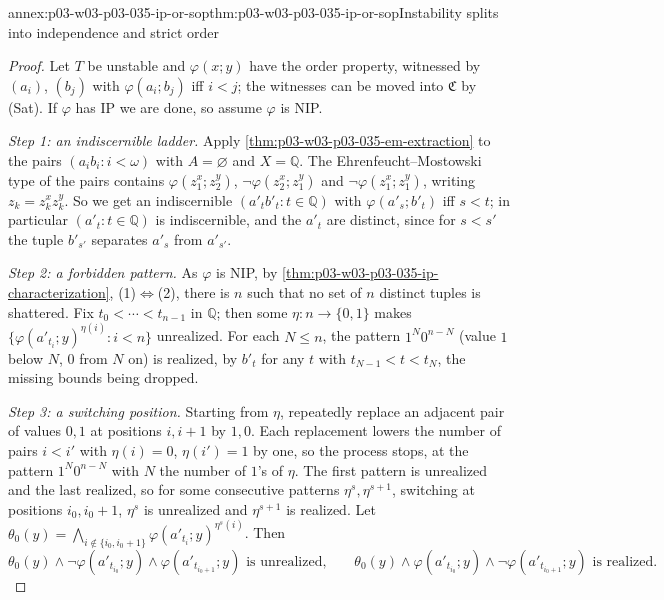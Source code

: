 \begin{annexitem}{annex:p03-w03-p03-035-ip-or-sop}{thm:p03-w03-p03-035-ip-or-sop}{Instability splits into independence and strict order}
\begin{proof}
Let \(T\) be unstable and \(\varphi(x;y)\) have the order property, witnessed
by \((a_i)\), \((b_j)\) with \(\varphi(a_i;b_j)\) iff \(i<j\); the witnesses can
be moved into \(\mathfrak C\) by (Sat).  If \(\varphi\) has IP we are done, so
assume \(\varphi\) is NIP.

\emph{Step 1: an indiscernible ladder.}  Apply
\cref{thm:p03-w03-p03-035-em-extraction} to the pairs \((a_ib_i:i<\omega)\)
with \(A=\varnothing\) and \(X=\mathbb Q\).  The Ehrenfeucht--Mostowski type
of the pairs contains \(\varphi(z^x_1;z^y_2)\), \(\neg\varphi(z^x_2;z^y_1)\)
and \(\neg\varphi(z^x_1;z^y_1)\), writing \(z_k=z^x_kz^y_k\).  So we get an
indiscernible \((a'_tb'_t:t\in\mathbb Q)\) with \(\varphi(a'_s;b'_t)\) iff
\(s<t\); in particular \((a'_t:t\in\mathbb Q)\) is indiscernible, and the
\(a'_t\) are distinct, since for \(s<s'\) the tuple \(b'_{s'}\) separates
\(a'_s\) from \(a'_{s'}\).

\emph{Step 2: a forbidden pattern.}  As \(\varphi\) is NIP, by
\cref{thm:p03-w03-p03-035-ip-characterization}, (1)\(\Leftrightarrow\)(2),
there is \(n\) such that no set of \(n\) distinct tuples is shattered.  Fix
\(t_0<\cdots<t_{n-1}\) in \(\mathbb Q\); then some
\(\eta:n\to\{0,1\}\) makes \(\{\varphi(a'_{t_i};y)^{\eta(i)}:i<n\}\)
unrealized.  For each \(N\leq n\), the pattern \(1^N0^{n-N}\) (value \(1\)
below \(N\), \(0\) from \(N\) on) is realized, by \(b'_t\) for any \(t\) with
\(t_{N-1}<t<t_N\), the missing bounds being dropped.

\emph{Step 3: a switching position.}  Starting from \(\eta\), repeatedly
replace an adjacent pair of values \(0,1\) at positions \(i,i+1\) by
\(1,0\).  Each replacement lowers the number of pairs \(i<i'\) with
\(\eta(i)=0\), \(\eta(i')=1\) by one, so the process stops, at the pattern
\(1^N0^{n-N}\) with \(N\) the number of \(1\)'s of \(\eta\).  The first pattern
is unrealized and the last realized, so for some consecutive patterns
\(\eta^s,\eta^{s+1}\), switching at positions \(i_0,i_0+1\), \(\eta^s\) is
unrealized and \(\eta^{s+1}\) is realized.  Let
\(\theta_0(y)=\bigwedge_{i\notin\{i_0,i_0+1\}}\varphi(a'_{t_i};y)^{\eta^s(i)}\).
Then
\[
  \theta_0(y)\wedge\neg\varphi(a'_{t_{i_0}};y)\wedge\varphi(a'_{t_{i_0+1}};y)
  \text{ is unrealized,}\qquad
  \theta_0(y)\wedge\varphi(a'_{t_{i_0}};y)\wedge\neg\varphi(a'_{t_{i_0+1}};y)
  \text{ is realized.}
\]


\end{proof}
\end{annexitem}

